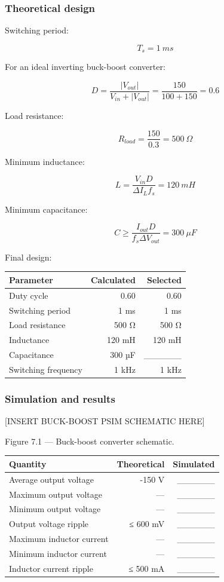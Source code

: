 \documentclass[
  paper=a4,
  oneside  ,captions=tableheading
]{scrartcl}
\newcounter{none}
\begin{document}
\subsubsection{Theoretical design}\label{theoretical-design-2}

Switching period:

\[
T_s=1\ ms
\]

For an ideal inverting buck-boost converter:

\[
D=
\frac{|V_{out}|}
{V_{in}+|V_{out}|}
=
\frac{150}{100+150}
=
0.6
\]

Load resistance:

\[
R_{load}=
\frac{150}{0.3}
=
500\ \Omega
\]

Minimum inductance:

\[
L=
\frac{V_{in}D}
{\Delta I_Lf_s}
=
120\ mH
\]

Minimum capacitance:

\[
C\geq
\frac{I_{out}D}
{f_s\Delta V_{out}}
=
300\ \mu F
\]

Final design:

{\def\LTcaptype{none} %
\begin{longtable}[]{@{}lrr@{}}
\toprule\noalign{}
Parameter & Calculated & Selected \\
\midrule\noalign{}
\endhead
\bottomrule\noalign{}
\endlastfoot
Duty cycle & 0.60 & 0.60 \\
Switching period & 1 ms & 1 ms \\
Load resistance & 500 Ω & 500 Ω \\
Inductance & 120 mH & 120 mH \\
Capacitance & 300 µF & \_\_\_\_\_\_ \\
Switching frequency & 1 kHz & 1 kHz \\
\end{longtable}
}

\subsubsection{Simulation and results}\label{simulation-and-results-1}

{[}INSERT BUCK-BOOST PSIM SCHEMATIC HERE{]}

Figure 7.1 --- Buck-boost converter schematic.

{\def\LTcaptype{none} %
\begin{longtable}[]{@{}lrr@{}}
\toprule\noalign{}
Quantity & Theoretical & Simulated \\
\midrule\noalign{}
\endhead
\bottomrule\noalign{}
\endlastfoot
Average output voltage & -150 V & \_\_\_\_\_\_ \\
Maximum output voltage & --- & \_\_\_\_\_\_ \\
Minimum output voltage & --- & \_\_\_\_\_\_ \\
Output voltage ripple & ≤ 600 mV & \_\_\_\_\_\_ \\
Maximum inductor current & --- & \_\_\_\_\_\_ \\
Minimum inductor current & --- & \_\_\_\_\_\_ \\
Inductor current ripple & ≤ 500 mA & \_\_\_\_\_\_ \\
\end{longtable}
}
\end{document}
